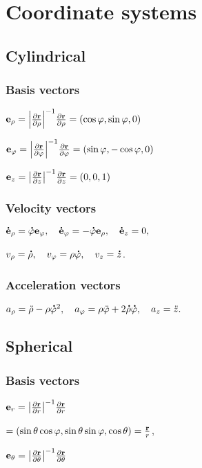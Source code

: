 \section{Coordinate systems}



\subsection{Cylindrical}



\subsubsection*{Basis vectors}

$\mathbf{e}_{\rho}=\abs{\pdv{\mathbf{r}}{\rho}}^{-1}\pdv{\mathbf{r}}{\rho}=\qty(\cos\varphi,\sin\varphi,0)$

$\mathbf{e}_{\varphi}=\abs{\pdv{\mathbf{r}}{\varphi}}^{-1}\pdv{\mathbf{r}}{\varphi}=\qty(\sin\varphi,-\cos\varphi,0)$

$\mathbf{e}_{z}=\abs{\pdv{\mathbf{r}}{z}}^{-1}\pdv{\mathbf{r}}{z}=\qty(0,0,1)$
\subsubsection*{Velocity vectors}
$\accentset{\mbox{\bfseries .}}{\mathbf{e}}_{\rho}=\accentset{\mbox{\bfseries .}}{\varphi}\mathbf{e}_{\varphi},\hspace{1em} \accentset{\mbox{\bfseries .}}{\mathbf{e}}_{\varphi}=-\accentset{\mbox{\bfseries .}}{\varphi}\mathbf{e}_{\rho},\hspace{1em} \accentset{\mbox{\bfseries .}}{\mathbf{e}}_{z}=0,$

$v_{\rho}=\accentset{\mbox{\bfseries .}}{\rho},\hspace{1em} v_{\varphi}=\rho\accentset{\mbox{\bfseries .}}{\varphi},\hspace{1em} v_{z}=\accentset{\mbox{\bfseries .}}{z}$.                
\subsubsection*{Acceleration vectors}
$a_{\rho}=\ddot{\rho}-\rho\accentset{\mbox{\bfseries .}}{\varphi}^{2},\hspace{1em} a_{\varphi}=\rho\ddot{\varphi}+2\accentset{\mbox{\bfseries .}}{\rho}\accentset{\mbox{\bfseries .}}{\varphi},\hspace{1em} a_{z}=\ddot{z}.$


\subsection{Spherical}
\subsubsection*{Basis vectors}
$\mathbf{e}_{r}=\abs{\pdv{\mathbf{r}}{r}}^{-1}\pdv{\mathbf{r}}{r}$

$=\qty(\sin\theta\cos\varphi,\sin\theta\sin\varphi,\cos\theta)=\frac{\mathbf{r}}{r}$,

$\mathbf{e}_{\theta}=\abs{\pdv{\mathbf{r}}{\theta}}^{-1}\pdv{\mathbf{r}}{\theta}$

